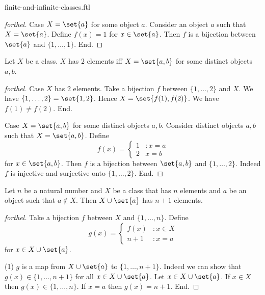 \documentclass{naproche-library}
\begin{document}
\begin{smodule}{finite-and-infinite-classes.ftl}
\begin{proof}[forthel]
    Case $X = \set{a}$ for some object $a$.
      Consider an object $a$ such that $X = \set{a}$.
      Define $f(x) = 1$ for $x \in \set{a}$.
    Then $f$ is a bijection between $\set{a}$ and $\{ 1, \dots, 1 \}$.
    End.
  \end{proof}

  \begin{proposition}[forthel,id=FOUNDATIONS_14_3468912675458910]
    Let $X$ be a class.
    $X$ has $2$ elements iff $X = \set{a, b}$ for some distinct objects $a, b$.
  \end{proposition}
  \begin{proof}[forthel]
    Case $X$ has $2$ elements.
      Take a bijection $f$ between $\{ 1, \dots, 2 \}$ and $X$.
      We have $\{ 1, \dots, 2 \} = \set{1, 2}$.
      Hence $X = \set{f(1), f(2)}$.
      We have $f(1) \neq f(2)$.
    End.

    Case $X = \set{a, b}$ for some distinct objects $a, b$.
      Consider distinct objects $a, b$ such that $X = \set{a, b}$.
      Define \[f(x) =
        \begin{cases}
          1 & : x = a \\
          2 & x = b
        \end{cases}\]
      for $x \in \set{a, b}$.
      Then $f$ is a bijection between $\set{a, b}$ and $\{ 1, \dots, 2 \}$.
      Indeed $f$ is injective and surjective onto $\{ 1, \dots, 2 \}$.
    End.
  \end{proof}

  \begin{proposition}[forthel,id=FOUNDATIONS_14_0615204230800975]
    Let $n$ be a natural number and $X$ be a class that has $n$ elements and $a$ be an object such that $a \notin X$.
    Then $X \cup \set{a}$ has $n + 1$ elements.
  \end{proposition}
  \begin{proof}[forthel]
    Take a bijection $f$ between $X$ and $\{ 1, \dots, n \}$.
    Define \[g(x) =
      \begin{cases}
        f(x)  & : x \in X \\
        n + 1 & : x = a
      \end{cases}\]
    for $x \in X \cup \set{a}$.

    (1) $g$ is a map from $X \cup \set{a}$ to $\{ 1, \dots, n + 1 \}$. \newline
    Indeed we can show that $g(x) \in \{ 1, \dots, n + 1 \}$ for all $x \in X \cup \set{a}$.
      Let $x \in X \cup \set{a}$.
      If $x \in X$ then $g(x) \in \{ 1, \dots, n \}$.
      If $x = a$ then $g(x) = n + 1$.
    End.


\end{proof}
\end{smodule}
\end{document}
